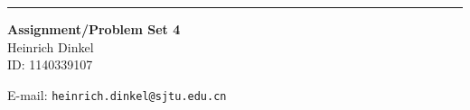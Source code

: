 \documentclass{article}
\begin{document}
\begin{CJK}{UTF8}{gbsn}


\hrule

\vspace{0.4in}
\begin{center}
{\bf Assignment/Problem Set 4\\}
\bigskip
Heinrich Dinkel\\
ID: 1140339107\\
\smallskip
\date
\bigskip

E-mail: {\tt heinrich.dinkel@sjtu.edu.cn}\\

\end{center}

\newcommand{\ppath}{.}


%
\newpage
\end{CJK}
\end{document}
